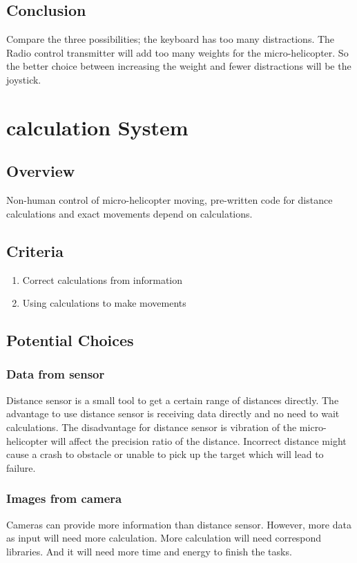 \documentclass[letterpaper, 10, draftclsnofoot, onecolumn, compsoc]{IEEEtran}
\begin{document}
{\subsection{Conclusion}
Compare the three possibilities; the keyboard has too many distractions.
The Radio control transmitter will add too many weights for the micro-helicopter.
So the better choice between increasing the weight and fewer distractions will be the joystick.

\section{calculation System}

\subsection{Overview}
Non-human control of micro-helicopter moving, pre-written code for distance calculations and exact movements depend on calculations.

\subsection{Criteria}
\begin{enumerate}
\item{Correct calculations from information}
\item{Using calculations to make movements}
\end{enumerate}

\subsection{Potential Choices}

\subsubsection{Data from sensor}
Distance sensor is a small tool to get a certain range of distances directly.
The advantage to use distance sensor is receiving data directly and no need to wait calculations.
The disadvantage for distance sensor is vibration of the micro-helicopter will affect the precision ratio of the distance.
Incorrect distance might cause a crash to obstacle or unable to pick up the target which will lead to failure.

\subsubsection{Images from camera}
Cameras can provide more information than distance sensor.
However, more data as input will need more calculation.
More calculation will need correspond libraries. And it will need more time and energy to finish the tasks.

}
\end{document}
